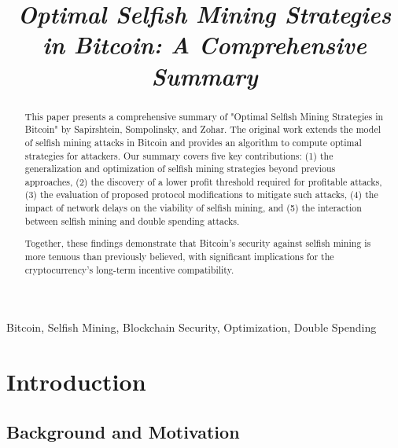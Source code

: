 \documentclass[conference]{IEEEtran}
\begin{document}
\title{\textit{Optimal Selfish Mining Strategies in Bitcoin: A Comprehensive Summary}\\
}

\author{
}

\maketitle

\begin{abstract}
    This paper presents a comprehensive summary of "Optimal Selfish Mining Strategies in Bitcoin" by Sapirshtein, Sompolinsky, and Zohar. The original work extends the model of selfish mining attacks in Bitcoin and provides an algorithm to compute optimal strategies for attackers. Our summary covers five key contributions: 
    (1) the generalization and optimization of selfish mining strategies beyond previous approaches, 
    (2) the discovery of a lower profit threshold required for profitable attacks, 
    (3) the evaluation of proposed protocol modifications to mitigate such attacks, 
    (4) the impact of network delays on the viability of selfish mining, and 
    (5) the interaction between selfish mining and double spending attacks. 
    
    Together, these findings demonstrate that Bitcoin's security against selfish mining is more tenuous than previously believed, with significant implications for the cryptocurrency's long-term incentive compatibility.
\end{abstract}

\begin{IEEEkeywords}
    Bitcoin, Selfish Mining, Blockchain Security, Optimization, Double Spending
\end{IEEEkeywords}

\section{Introduction}

\subsection{Background and Motivation}
\end{document}
